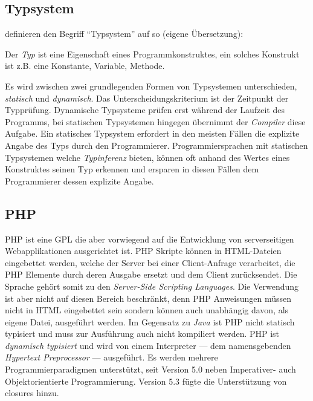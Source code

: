 \subsection{Typsystem}
\label{sec:typesystem}

\citeauthor{voelterDSLEngineering} definieren den Begriff \enquote{Typsystem} auf \cite[][S. 253]{voelterDSLEngineering} so (eigene Übersetzung):


Der \emph{Typ} ist eine Eigenschaft eines Programmkonstruktes, ein solches Konstrukt ist z.B. eine Konstante, Variable, Methode.

Es wird zwischen zwei grundlegenden Formen von Typsystemen unterschieden, \emph{statisch} und \emph{dynamisch}. Das Unterscheidungskriterium ist der Zeitpunkt der Typprüfung. Dynamische Typsysteme prüfen erst während der Laufzeit des Programms, bei statischen Typsystemen hingegen übernimmt der \emph{Compiler} diese Aufgabe. Ein statisches Typsystem erfordert in den meisten Fällen die explizite Angabe des Typs durch den Programmierer. Programmiersprachen mit statischen Typsystemen welche \emph{Typinferenz} bieten, können oft anhand des Wertes eines Konstruktes seinen Typ erkennen und ersparen in diesen Fällen dem Programmierer dessen explizite Angabe.

\subsection{PHP}
\label{sec:php}

PHP ist eine \gls{GPL} die aber vorwiegend auf die Entwicklung von serverseitigen Webapplikationen ausgerichtet ist. PHP Skripte können in HTML-Dateien eingebettet werden, welche der Server bei einer Client-Anfrage verarbeitet, die PHP Elemente durch deren Ausgabe ersetzt und dem Client zurücksendet. Die Sprache gehört somit zu den \emph{Server-Side Scripting Languages}. Die Verwendung ist aber nicht auf diesen Bereich beschränkt, denn PHP Anweisungen müssen nicht in HTML eingebettet sein sondern können auch unabhängig davon, als eigene Datei, ausgeführt werden.
Im Gegensatz zu \emph{Java} ist PHP nicht statisch typisiert und muss zur Ausführung auch nicht kompiliert werden. PHP ist \emph{dynamisch typisiert} und wird von einem Interpreter --- dem namensgebenden \emph{Hypertext Preprocessor} --- ausgeführt.
Es werden mehrere Programmierparadigmen unterstützt, seit Version 5.0 neben Imperativer- auch Objektorientierte Programmierung. Version 5.3 fügte die Unterstützung von \glspl{closure} hinzu.

